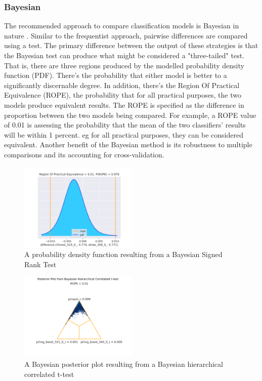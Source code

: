 \documentclass{article}
\begin{document}
        \subsubsection{Bayesian}
            The recommended approach to compare classification models is Bayesian in nature \cite{eval2018,stat2017,time2017}.
            Similar to the frequentist approach, pairwise differences are compared using a test.
            The primary difference between the output of these strategies is that the Bayesian test can produce what might be considered a "three-tailed" test.
            That is, there are three regions produced by the modelled probability density function (PDF).
            There's the probability that either model is better to a significantly discernable degree.
            In addition, there's the Region Of Practical Equivalence (ROPE), the probability that for all practical purposes, the two models produce equivalent results.
            The ROPE is specified as the difference in proportion between the two models being compared. 
            For example, a ROPE value of 0.01 is assessing the probability that the mean of the two classifiers' results will be within 1 percent.
            eg for all practical purposes, they can be considered equivalent. 
            Another benefit of the Bayesian method is its robustness to multiple comparisons and  its accounting for cross-validation.
            \begin{figure}
                \centering
                \includegraphics[width=0.5\textwidth]{rope_rforest_519_0__etree_358_0_.png}
                \caption{A probability density function resulting from a Bayesian Signed Rank Test}
                \label{fig:bayes_on_one}
            \end{figure}
            \newline
            \begin{figure}
                \centering
                    \includegraphics[width=0.5\textwidth]{rope_on_two_hxg_boost_531_0__hxg_boost_540_0_.png}
                    \caption{A Bayesian posterior plot resulting from a Bayesian hierarchical correlated t-test}
                    \label{fig:bayes_on_two}
                \end{figure}
\end{document}
